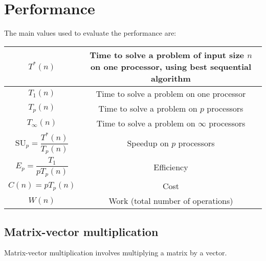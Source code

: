 \section{Performance}

The main values used to evaluate the performance are: 
\renewcommand*{\arraystretch}{2}
\begin{table}[H]
    \centering
    \begin{tabular}{|c|c|}
    \hline
    $T^\ast(n)$ & Time to solve a problem of input size $n$ on one processor, using best sequential algorithm               \\ \hline
    $T_1(n)$ & Time to solve a problem on one processor                  \\ \hline
    $T_p(n)$ & Time to solve a problem on $p$ processors                    \\ \hline
    $T_{\infty}(n)$ & Time to solve a problem on $\infty$ processors        \\ \hline
    $\text{SU}_p = \dfrac{T^\ast(n)}{T_p(n)}$ & Speedup on $p$ processors    \\ \hline
    $E_p = \dfrac{T_1}{p T_p(n)}$ & Efficiency                               \\ \hline
    $C(n) = p T_p(n)$ & Cost                                               \\ \hline
    $W(n)$ & Work (total number of operations)                               \\ \hline
    \end{tabular}
\end{table}
\renewcommand*{\arraystretch}{1}

\subsection{Matrix-vector multiplication}
Matrix-vector multiplication involves multiplying a matrix by a vector.

